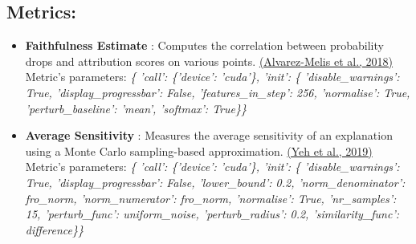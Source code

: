 \documentclass{article}%
\begin{document}
\subsection*{Metrics:}%
\label{subsec:Metrics}%
\begin{itemize}%
\item%
\textbf{Faithfulness Estimate}%
: Computes the correlation between probability drops and attribution scores on various points.%
\href{https://arxiv.org/abs/1806.07538}{(Alvarez{-}Melis et al., 2018)}%
\newline%
%
Metric's parameters: \newline%
%
\textit{\{   'call': \{'device': 'cuda'\},\newline%
    'init': \{   'disable\_warnings': True,\newline%
                'display\_progressbar': False,\newline%
                'features\_in\_step': 256,\newline%
                'normalise': True,\newline%
                'perturb\_baseline': 'mean',\newline%
                'softmax': True\}\} \newline%
}%
\item%
\textbf{Average Sensitivity}%
: Measures the average sensitivity of an explanation using a Monte Carlo sampling{-}based approximation.%
\href{https://arxiv.org/abs/1901.09392}{(Yeh et al., 2019)}%
\newline%
%
Metric's parameters: \newline%
%
\textit{\{   'call': \{'device': 'cuda'\},\newline%
    'init': \{   'disable\_warnings': True,\newline%
                'display\_progressbar': False,\newline%
                'lower\_bound': 0.2,\newline%
                'norm\_denominator': fro\_norm,\newline%
                'norm\_numerator': fro\_norm,\newline%
                'normalise': True,\newline%
                'nr\_samples': 15,\newline%
                'perturb\_func': uniform\_noise,\newline%
                'perturb\_radius': 0.2,\newline%
                'similarity\_func': difference\}\} \newline%
}
\end{itemize}
\end{document}
